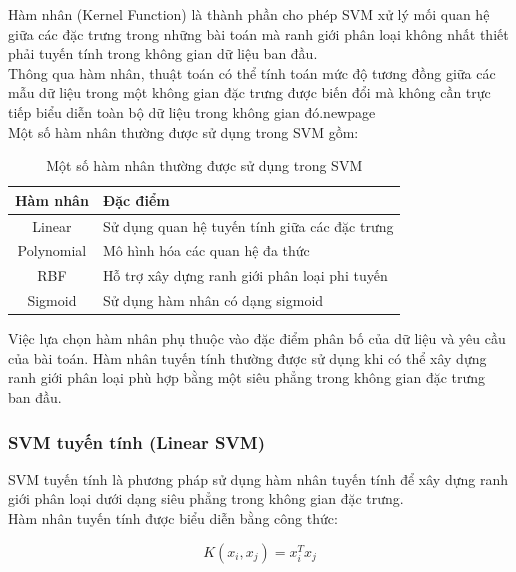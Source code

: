 \documentclass[14pt]{extarticle}
\begin{document}
		\noindent
		Hàm nhân (Kernel Function) là thành phần cho phép SVM xử lý mối quan hệ giữa các đặc trưng trong những bài toán mà ranh giới phân loại không nhất thiết phải tuyến tính trong không gian dữ liệu ban đầu.\\
		
		\noindent
		Thông qua hàm nhân, thuật toán có thể tính toán mức độ tương đồng giữa các mẫu dữ liệu trong một không gian đặc trưng được biến đổi mà không cần trực tiếp biểu diễn toàn bộ dữ liệu trong không gian đó.newpage\\
		
		\noindent
		Một số hàm nhân thường được sử dụng trong SVM gồm:
		
		\begin{table}[H]
			\centering
			\caption{Một số hàm nhân thường được sử dụng trong SVM}
			\label{tab:svm_kernel}
			\begin{tabular}{|c|p{9cm}|}
				\hline
				\textbf{Hàm nhân} & \textbf{Đặc điểm} \\
				\hline
				Linear & Sử dụng quan hệ tuyến tính giữa các đặc trưng \\
				\hline
				Polynomial & Mô hình hóa các quan hệ đa thức \\
				\hline
				RBF & Hỗ trợ xây dựng ranh giới phân loại phi tuyến \\
				\hline
				Sigmoid & Sử dụng hàm nhân có dạng sigmoid \\
				\hline
			\end{tabular}
		\end{table}
		
		
		\noindent
		Việc lựa chọn hàm nhân phụ thuộc vào đặc điểm phân bố của dữ liệu và yêu cầu của bài toán. Hàm nhân tuyến tính thường được sử dụng khi có thể xây dựng ranh giới phân loại phù hợp bằng một siêu phẳng trong không gian đặc trưng ban đầu.
		
		\subsubsection{SVM tuyến tính (Linear SVM)}
		
		\noindent
		SVM tuyến tính là phương pháp sử dụng hàm nhân tuyến tính để xây dựng ranh giới phân loại dưới dạng siêu phẳng trong không gian đặc trưng.\\
		
		\noindent
		Hàm nhân tuyến tính được biểu diễn bằng công thức:
		
		\begin{equation*}
			K(x_i,x_j)=x_i^Tx_j
		\end{equation*}
		
\end{document}
